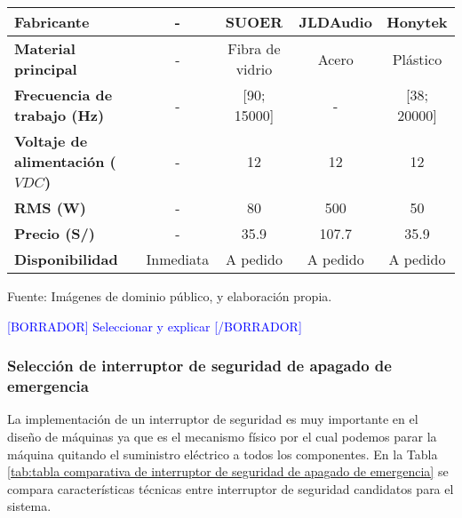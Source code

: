\begin{itemize}
\begin{mytable}[H]
\begin{tabular}{l|c|c|c|c|}
			\multicolumn{1}{|l|}{\textbf{Fabricante}} & - & SUOER & JLDAudio & 
			Honytek \\ \hline
			\multicolumn{1}{|l|}{\textbf{Material principal}} & - & Fibra de vidrio & Acero & Plástico \\ \hline
			\multicolumn{1}{|l|}{				
				\begin{minipage}{\myforthmaxsizeofcontenttable}	
					\textbf{Frecuencia de trabajo (Hz)}
				\end{minipage}
			}& - & [90; 15000] & - & [38; 20000]  \\ \hline
			\multicolumn{1}{|l|}{
				\begin{minipage}{\myforthmaxsizeofcontenttable}	
					\textbf{Voltaje de alimentación ($VDC$)}
				\end{minipage}
			} & - & 12 & 12 & 12 \\ \hline
			\multicolumn{1}{|l|}{\textbf{RMS (W)}}                 & -  & 80 & 500 & 50 \\ \hline
			\multicolumn{1}{|l|}{\textbf{Precio (S/)}}             & - & 35.9 & 107.7 & 35.9 \\ \hline
			\multicolumn{1}{|l|}{\textbf{Disponibilidad}}          & Inmediata                                                             & A pedido        & A pedido    & A pedido           \\ \hline
		\end{tabular}
		\begin{flushleft}	
			Fuente: Imágenes de dominio público, %
			 y elaboración propia.
		\end{flushleft}
	\end{mytable}

	\textcolor{blue}{[BORRADOR] Seleccionar y explicar [/BORRADOR]}
	
\end{itemize}

\subsubsection{Selección de interruptor de seguridad de apagado de emergencia}

La implementación de un interruptor de seguridad es muy importante en el diseño de máquinas ya que es el mecanismo físico por el cual podemos parar la máquina quitando el suministro eléctrico a todos los componentes. En la Tabla \ref{tab:tabla comparativa de interruptor de seguridad de apagado de emergencia} se compara características técnicas entre interruptor de seguridad candidatos para el sistema.

